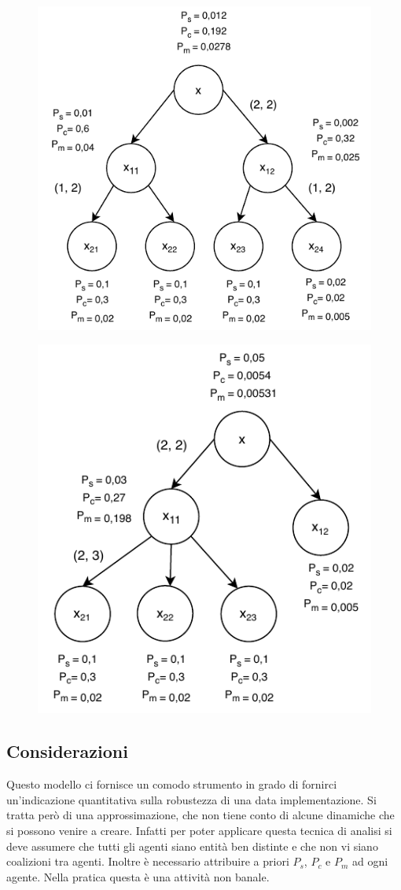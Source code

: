 \begin{figure}[H]
	\centering
	\includegraphics[width=0.6\linewidth]{images/chap_analisi_robustezza/robustezza-2-2.pdf}
\end{figure}

\begin{figure}[H]
	\centering
	\includegraphics[width=0.6\linewidth]{images/chap_analisi_robustezza/robustezza-2-3.pdf}
\end{figure}

\subsection{Considerazioni}
Questo modello ci fornisce un comodo strumento in grado di fornirci
un'indicazione quantitativa sulla robustezza di una data implementazione.
Si tratta però di una approssimazione,
che non tiene conto di alcune dinamiche che si possono venire a creare. Infatti per poter
applicare questa tecnica di analisi si deve assumere che tutti gli agenti siano entità ben distinte
e che non vi siano coalizioni tra agenti. Inoltre è necessario attribuire a priori
$ P_s $, $ P_c $ e $ P_m $ ad ogni agente. Nella pratica questa è una attività non banale.

